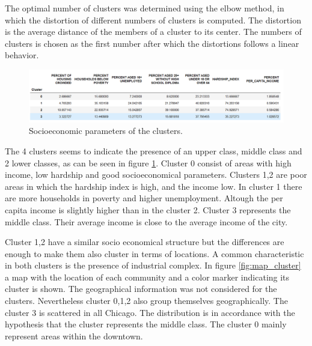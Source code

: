 \documentclass[a4paper,12pt]{article}
\begin{document}
The optimal number of clusters was determined using the elbow method, in which the distortion of different numbers of clusters is computed. The distortion is the average distance of the members of a cluster to its center. The numbers of clusters is chosen as the first number after which the distortions follows a linear behavior.


\begin{figure}[!h]
 \centering
\includegraphics[width=17cm]{economic_indicators_clusters}
\caption{Socioeconomic parameters of the clusters. 
\label{fig:socio_cluster}}
\end{figure} 

The 4 clusters seems to indicate the presence of an upper class, middle class and 2 lower classes, as can be seen in figure \ref{fig:socio_cluster}. Cluster 0 consist of areas with high income, low hardship and good socioeconomical parameters. Clusters 1,2 are poor areas in which the hardship index is high, and the income low. In cluster 1 there are more households in poverty and higher unemployment. Altough the per capita income is slightly higher than in the cluster 2. Cluster 3 represents the middle class. Their average income is close to the average income of the city. 

Cluster 1,2 have a similar socio economical structure but the differences are enough to make them also cluster in terms of locations. A common characteristic in both clusters is the presence of industrial complex. In figure \ref{fig:map_cluster} a map with the location of each community and a color marker indicating its cluster is shown. The geographical information was not considered for the clusters. Nevertheless cluster 0,1,2 also group themselves geographically. The cluster 3 is scattered in all Chicago. The distribution is in accordance with the hypothesis that the cluster represents the middle class. The cluster 0 mainly represent areas within the downtown.
\end{document}
